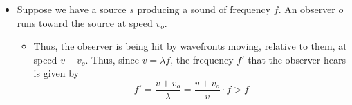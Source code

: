 \documentclass[../notes.tex]{subfiles}
\begin{document}
\begin{itemize}
\begin{figure}[h!]
        \caption{Sound waves of slightly varying frequencies.}
        \label{fig:varyingFrequencies}
    \end{figure}
    \begin{itemize}
        \item Consider frequencies $f_1,f_2$ where $\Delta f<<f_1,f_2$.
        \item Since $k=2\pi f/v_\text{sound}$ and $\omega=2\pi f$ (i.e., both quantities depend on frequency), we have that
        \begin{align*}
            y &= y_1+y_2\\
            &= A[\cos(k_1x-\omega_1t)+\cos(k_2x-\omega_2t)]
            \intertext{Suppose $x=0$.}
            &= A[\cos(\omega_1t)+\cos(\omega_2t)]\\
            &= 2A\cos\left( \frac{\omega_1+\omega_2}{2}\cdot t \right)\cos\left( \frac{\omega_1-\omega_2}{2}\cdot t \right)\\
            &= 2A\cos(\bar{\omega}t)\cos\left( \frac{\Delta\omega}{2}\cdot t \right)
        \end{align*}
        \item Since $\bar{\omega}>>\Delta\omega$, $y$ looks like the end result in Figure \ref{fig:varyingFrequencies}.
        \item Thus, we will hear $\bar{\omega}$, but there will be silences interspersed.
        \begin{itemize}
            \item These nodes are called \textbf{beats}, and $f_\text{beat}=f_1-f_2$.
        \end{itemize}
    \end{itemize}
    \item Suppose we have a source $s$ producing a sound of frequency $f$. An observer $o$ runs toward the source at speed $v_o$.
    \begin{itemize}
        \item Thus, the observer is being hit by wavefronts moving, relative to them, at speed $v+v_o$. Thus, since $v=\lambda f$, the frequency $f'$ that the observer hears is given by
        \begin{equation*}
            f' = \frac{v+v_o}{\lambda}
            = \frac{v+v_o}{v}\cdot f
            > f
        \end{equation*}

\end{itemize}
\end{itemize}
\end{document}
